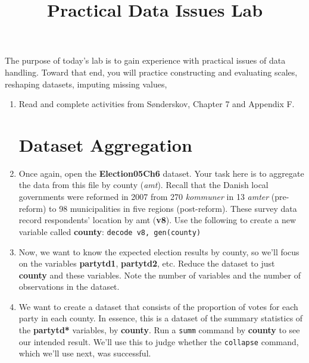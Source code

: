 \documentclass[a4paper,12pt]{article}
\title{Practical Data Issues Lab}
\author{}
\date{}
\begin{document}
	
\maketitle

\vspace{-3em}
	
\noindent The purpose of today's lab is to gain experience with practical issues of data handling. Toward that end, you will practice constructing and evaluating scales, reshaping datasets, imputing missing values, 

\begin{enumerate}\itemsep1em

\section*{Scale Construction}

\item Read and complete activities from S{\o}nderskov, Chapter 7 and Appendix F.

\section*{Dataset Aggregation}

\item Once again, open the \textbf{Election05Ch6} dataset. Your task here is to aggregate the data from this file by county (\textit{amt}). Recall that the Danish local governments were reformed in 2007 from 270 \textit{kommuner} in 13 \textit{amter} (pre-reform) to 98 municipalities in five regions (post-reform). These survey data record respondents' location by amt (\textbf{v8}). Use the following to create a new variable called \textbf{county}: \texttt{decode v8, gen(county)}

\item Now, we want to know the expected election results by county, so we'll focus on the variables \textbf{partytd1}, \textbf{partytd2}, etc. Reduce the dataset to just \textbf{county} and these variables. Note the number of variables and the number of observations in the dataset.

\item We want to create a dataset that consists of the proportion of votes for each party in each county. In essence, this is a dataset of the summary statistics of the \textbf{partytd*} variables, by \textbf{county}. Run a \texttt{summ} command by \textbf{county} to see our intended result. We'll use this to judge whether the \texttt{collapse} command, which we'll use next, was successful.


\end{enumerate}
\end{document}
